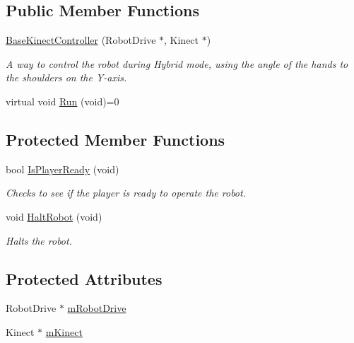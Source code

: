 \subsection*{\-Public \-Member \-Functions}
\begin{DoxyCompactItemize}
\item 
\hyperlink{class_base_kinect_controller_a9245dedb4e60fd36689e0f4715837be9}{\-Base\-Kinect\-Controller} (\-Robot\-Drive $\ast$, \-Kinect $\ast$)
\begin{DoxyCompactList}\small\item\em \-A way to control the robot during \-Hybrid mode, using the angle of the hands to the shoulders on the \-Y-\/axis. \end{DoxyCompactList}\item 
virtual void \hyperlink{class_base_kinect_controller_a14c4e3ec8d0f785204c84b06c745b200}{\-Run} (void)=0
\end{DoxyCompactItemize}
\subsection*{\-Protected \-Member \-Functions}
\begin{DoxyCompactItemize}
\item 
bool \hyperlink{class_base_kinect_controller_ad6e79c8e4afab9ba5451079890e31f39}{\-Is\-Player\-Ready} (void)
\begin{DoxyCompactList}\small\item\em \-Checks to see if the player is ready to operate the robot. \end{DoxyCompactList}\item 
void \hyperlink{class_base_kinect_controller_aa50bf361285ea614f0f323f930d13b15}{\-Halt\-Robot} (void)
\begin{DoxyCompactList}\small\item\em \-Halts the robot. \end{DoxyCompactList}\end{DoxyCompactItemize}
\subsection*{\-Protected \-Attributes}
\begin{DoxyCompactItemize}
\item 
\-Robot\-Drive $\ast$ \hyperlink{class_base_kinect_controller_a516661e146dae4762ed1a4cdbc626e24}{m\-Robot\-Drive}
\item 
\-Kinect $\ast$ \hyperlink{class_base_kinect_controller_adb1473e11205509ac1b0b61ad29477ad}{m\-Kinect}
\end{DoxyCompactItemize}


